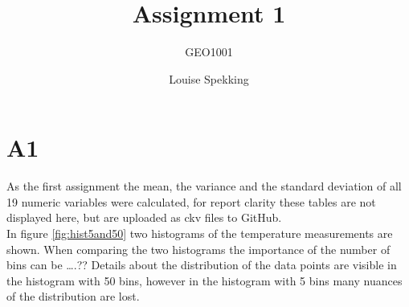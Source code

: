 \documentclass[whitelogo]{tudelft-report}
\begin{document}
\frontmatter


\title[tudelft-white]{Assignment 1}
\subtitle[tudelft-black]{GEO1001}
\author[tudelft-white]{Louise Spekking}
\makecover[split]


%

%

\tableofcontents


\mainmatter



\section {A1}
As the first assignment the mean, the variance and the standard deviation of all 19 numeric variables were calculated, for report clarity these tables are not displayed here, but are uploaded as ckv files to GitHub. 
\\
In figure \ref{fig:hist5and50} two histograms of the temperature measurements are shown. When comparing the two histograms the importance of the number of bins can be ….?? Details about the distribution of the data points are visible in the histogram with 50 bins, however in the histogram with 5 bins many nuances of the distribution are lost. 
 
\end{document}
